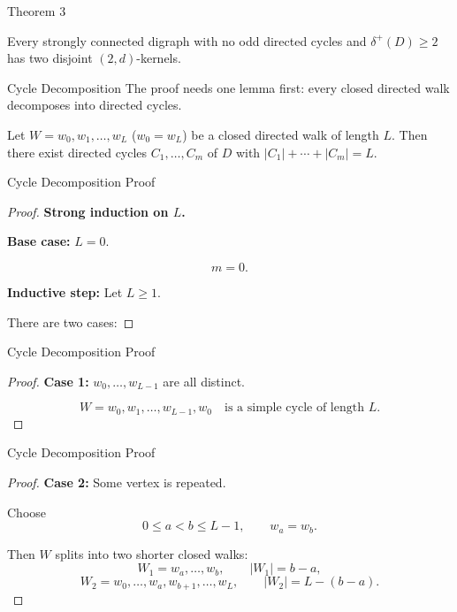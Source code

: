 \documentclass[11pt]{beamer}
\begin{document}
\begin{frame}{Theorem 3}
  \begin{theorem}
    Every strongly connected digraph with no odd directed cycles and
    $\delta^+(D)\ge 2$ has two disjoint $(2,d)$-kernels.
  \end{theorem}
\end{frame}

\begin{frame}{Cycle Decomposition}
  The proof needs one lemma first: every closed directed walk decomposes into
  directed cycles.
  \begin{lemma}
    Let $W = w_0, w_1, \dots, w_L$ ($w_0 = w_L$) be a closed directed walk of
    length $L$. Then there exist directed cycles $C_1, \dots, C_m$ of $D$ with
    $|C_1| + \cdots + |C_m| = L$.
  \end{lemma}
\end{frame}

\begin{frame}{Cycle Decomposition Proof}
  \begin{proof}
    \textbf{Strong induction on $L$.}

    \medskip
    \textbf{Base case:} $L=0$.

    \[
      m=0.
    \]

    \medskip
    \textbf{Inductive step:} Let $L\geq1$.

    There are two cases:

  \end{proof}
\end{frame}

\begin{frame}{Cycle Decomposition Proof}
  \begin{proof}
    \textbf{Case 1:} $w_0,\ldots,w_{L-1}$ are all distinct.

    \[
      \boxed{
        W=w_0,w_1,\ldots,w_{L-1},w_0
        \quad\text{is a simple cycle of length }L.
      }
    \]
  \end{proof}
\end{frame}

\begin{frame}{Cycle Decomposition Proof}
  \begin{proof}
    \textbf{Case 2:} Some vertex is repeated.

    Choose
    \[
      0\leq a<b\leq L-1,
      \qquad w_a=w_b.
    \]

    Then $W$ splits into two shorter closed walks:
    \[
      W_1=w_a,\ldots,w_b,
      \qquad
      |W_1|=b-a,
    \]
    \[
      W_2=w_0,\ldots,w_a,w_{b+1},\ldots,w_L,
      \qquad
      |W_2|=L-(b-a).
    \]
  \end{proof}
\end{frame}
\end{document}
